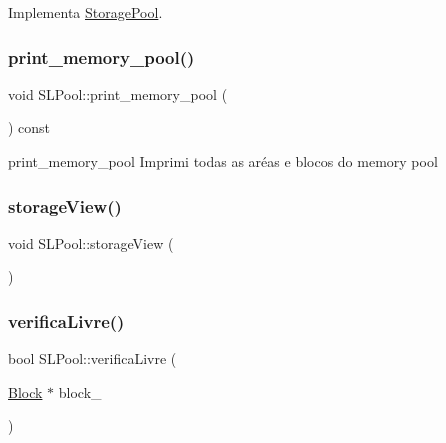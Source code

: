 Implementa \hyperlink{classStoragePool_a2120a75c4562735372d089685828b8df}{Storage\+Pool}.

\mbox{\label{classSLPool_a74c29c43b2e158ce4b50bd908e8b5fed}} 
\subsubsection{\texorpdfstring{print\+\_\+memory\+\_\+pool()}{print\_memory\_pool()}}
{\footnotesize\ttfamily void S\+L\+Pool\+::print\+\_\+memory\+\_\+pool (\begin{DoxyParamCaption}{ }\end{DoxyParamCaption}) const}



print\+\_\+memory\+\_\+pool Imprimi todas as aréas e blocos do memory pool 

\mbox{\label{classSLPool_a75d1c2e4e132a3f160842f95105de01d}} 
\subsubsection{\texorpdfstring{storage\+View()}{storageView()}}
{\footnotesize\ttfamily void S\+L\+Pool\+::storage\+View (\begin{DoxyParamCaption}{ }\end{DoxyParamCaption})}

\mbox{\label{classSLPool_af70db30fc4a7e39aebbaee06a508ad05}} 
\subsubsection{\texorpdfstring{verifica\+Livre()}{verificaLivre()}}
{\footnotesize\ttfamily bool S\+L\+Pool\+::verifica\+Livre (\begin{DoxyParamCaption}\item[{\hyperlink{structSLPool_1_1Block}{Block} $\ast$}]{block\+\_\+ }\end{DoxyParamCaption})\hspace{0.3cm}{\ttfamily [private]}}



